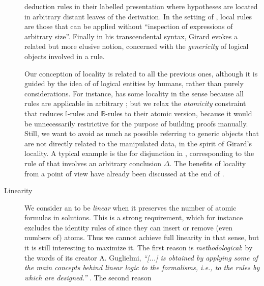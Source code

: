 \begin{scope}
\begin{description}
{    deduction} rules in their labelled presentation where hypotheses are located
    in arbitrary distant leaves of the derivation. In the setting of , local rules are those that can be applied without ``inspection
    of expressions of arbitrary size''. Finally in his transcendental syntax, Girard evokes
    a related but more elusive notion, concerned with the \emph{genericity} of
    logical objects involved in a rule.
    
    Our conception of locality is related to all the previous ones, although it
    is guided by the idea of  of logical entities by humans,
    rather than purely  considerations. For instance,
     has some locality in the  sense because all rules
    are applicable in arbitrary ; but we relax the \emph{atomicity}
    constraint that reduces $\mathbb{I}$-rules and $\mathbb{R}$-rules to their
    atomic version, because it would be unnecessarily restrictive for the
    purpose of building proofs manually. Still, we want to avoid as much as
    possible referring to generic objects that are not directly related to the
    manipulated data, in the spirit of Girard's locality. A typical example is
    the   for disjunction in , corresponding to the {\rsf{{\lor}{-}}} rule of  that
    involves an arbitrary conclusion $\Delta$. The benefits of locality from a
     point of view have already been discussed at the end of
    .
  \item[Linearity] 
    We consider an  to be \emph{linear} when it preserves the
    number of atomic formulas in solutions. This is a strong requirement, which
    for instance excludes the identity rules of  since they can insert
    or remove (even numbers of) atoms. Thus we cannot achieve full linearity in
    that sense, but it is still interesting to maximize it. The first reason is
    \emph{methodological}: by the words of its creator A. Guglielmi,
    \textit{``[...]  is obtained by applying some of the main
    concepts behind linear logic to the formalisms, i.e., to the rules by which
     are designed.''} . The second reason

\end{description}
\end{scope}
